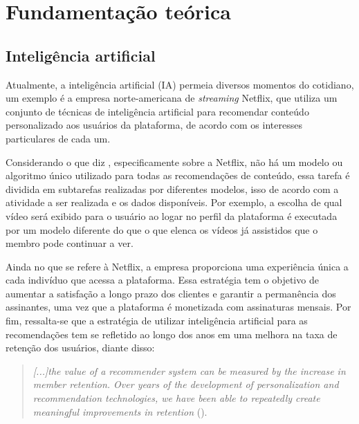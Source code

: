 
\chapter{Fundamentação teórica}

\section{Inteligência artificial}

Atualmente, a inteligência artificial (IA) permeia diversos 
momentos do cotidiano, um exemplo é a empresa norte-americana 
de \textit{streaming} Netflix, que utiliza um conjunto de 
técnicas de inteligência artificial para recomendar conteúdo personalizado aos 
usuários da plataforma, de acordo com os interesses 
particulares de cada um. 

Considerando o que diz \citet{netflix}, especificamente sobre a Netflix, 
não há um modelo ou algoritmo único utilizado 
para todas as recomendações de conteúdo, essa tarefa é 
dividida em subtarefas realizadas por diferentes modelos, isso de 
acordo com a atividade a ser realizada e os dados disponíveis. 
Por exemplo, a escolha de qual vídeo será exibido para 
o usuário ao logar no perfil da plataforma é executada por um 
modelo  diferente do que o que elenca os vídeos já assistidos que o 
membro pode continuar a ver.

Ainda no que se refere à Netflix, a empresa proporciona uma 
experiência única a cada indivíduo que acessa a plataforma. Essa 
estratégia tem o objetivo de aumentar a satisfação a longo prazo 
dos clientes e garantir a permanência dos assinantes, uma vez 
que a plataforma é monetizada com assinaturas mensais. Por fim, ressalta-se
 que a estratégia de utilizar inteligência 
artificial para as recomendações tem se refletido ao longo 
dos anos em uma melhora na taxa de retenção dos usuários, diante disso:

\begin{quote}
  \textit{[...]the value of a recommender system can be measured by
the increase in member retention. Over years of the development of personalization and recommendation technologies, we have been able to repeatedly create meaningful
improvements in retention} (\cite{netflix}).
\end{quote}

